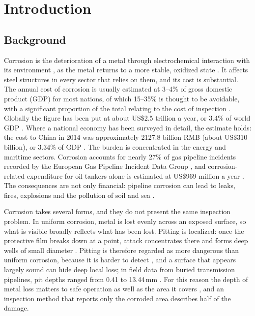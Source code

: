\chapter[INTRODUCTION]{Introduction}
\label{ch:introduction}


\section{Background}
\label{sec:background}

Corrosion is the deterioration of a metal through electrochemical interaction
with its environment \citep{Alvani2026}, as the metal returns to a more
stable, oxidized state \citep{Elizalde2023}. It affects
steel structures in every sector that relies on them, and its cost is
substantial. The annual cost of corrosion is usually estimated at 3--4\% of
gross domestic product (GDP) for most nations, of which 15--35\% is thought to
be avoidable, with a significant proportion of the total relating to the cost
of inspection \citep{Nash2022}. Globally the figure has been put at about
US\$2.5 trillion a year, or 3.4\% of world GDP \citep{Imran2025}. Where a
national economy has been surveyed in detail, the estimate holds: the cost to
China in 2014 was approximately 2127.8 billion RMB (about US\$310 billion), or
3.34\% of GDP \citep{Hou2017}. The burden is concentrated in the energy and
maritime sectors. Corrosion accounts for nearly 27\% of gas pipeline
incidents recorded by the European Gas Pipeline Incident Data Group
\citep{Akhlaghi2023}, and corrosion-related expenditure for oil tankers alone
is estimated at US\$969 million a year \citep{Imran2025}. The consequences are
not only financial: pipeline corrosion can lead to leaks, fires, explosions and
the pollution of soil and sea \citep{Akhlaghi2023,Alvani2026}.

Corrosion takes several forms, and they do not present the same inspection
problem. In uniform corrosion, metal is lost evenly across an exposed surface,
so what is visible broadly reflects what has been lost. Pitting is localized:
once the protective film breaks down at a point, attack concentrates there and
forms deep wells of small diameter \citep{Soares2023}.
Pitting is therefore regarded as more dangerous than uniform corrosion,
because it is harder to detect \citep{Soares2023}, and a surface that appears
largely sound can hide deep local loss; in field data from buried transmission
pipelines, pit depths ranged from 0.41 to 13.44\,mm \citep{Akhlaghi2023}. For
this reason the depth of metal loss matters to safe operation as well as the
area it covers \citep{Akhlaghi2023,Huang2026a}, and an inspection method that
reports only the corroded area describes half of the damage.


